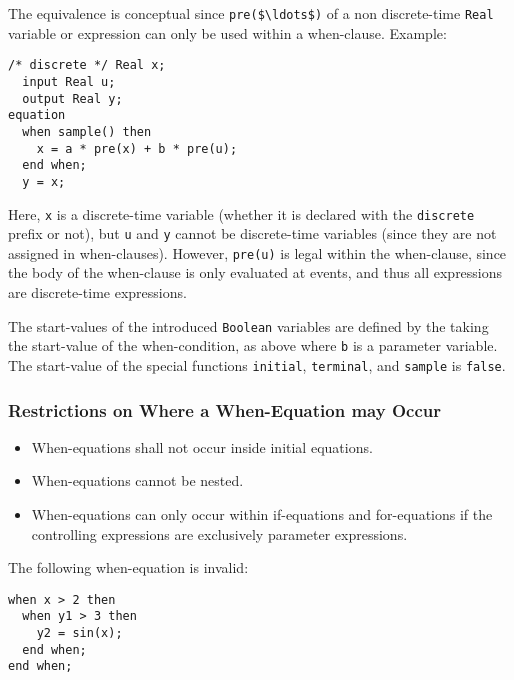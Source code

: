 \begin{nonnormative}
The equivalence is conceptual since \lstinline!pre($\ldots$)! of a non discrete-time \lstinline!Real! variable or expression can only be used within a when-clause.  Example:
\begin{lstlisting}[language=modelica]
  /* discrete */ Real x;
  input Real u;
  output Real y;
equation
  when sample() then
    x = a * pre(x) + b * pre(u);
  end when;
  y = x;
\end{lstlisting}

Here, \lstinline!x! is a discrete-time variable (whether it is declared with the \lstinline!discrete! prefix or not), but \lstinline!u! and \lstinline!y! cannot be discrete-time variables
(since they are not assigned in when-clauses).  However, \lstinline!pre(u)! is legal within the when-clause, since the body of the when-clause is only evaluated at events, and thus all expressions
are discrete-time expressions.
\end{nonnormative}

The start-values of the introduced \lstinline!Boolean! variables are defined by the taking the start-value of the when-condition, as above where \lstinline!b! is a parameter
variable.  The start-value of the special functions \lstinline!initial!, \lstinline!terminal!, and \lstinline!sample! is \lstinline!false!.

\subsubsection{Restrictions on Where a When-Equation may Occur}\label{restrictions-on-where-a-when-equation-may-occur}
\begin{itemize}
\item
  When-equations shall not occur inside initial equations.
\item
  When-equations cannot be nested.
\item
  When-equations can only occur within if-equations and for-equations if
  the controlling expressions are exclusively parameter expressions.
\end{itemize}

\begin{example}
The following when-equation is invalid:
\begin{lstlisting}[language=modelica]
when x > 2 then
  when y1 > 3 then
    y2 = sin(x);
  end when;
end when;
\end{lstlisting}
\end{example}

